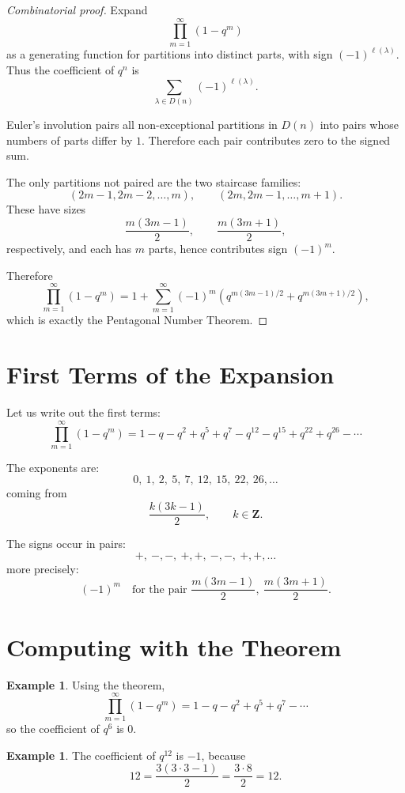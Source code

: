 \documentclass[11pt]{article}
\theoremstyle{definition}
\newtheorem{example}[theorem]{Example}
\theoremstyle{remark}
\newcommand{\ZZ}{\mathbf{Z}}
\begin{document}
	\begin{proof}[Combinatorial proof]
		Expand
		\[
		\prod_{m=1}^{\infty}(1-q^m)
		\]
		as a generating function for partitions into distinct parts, with sign \((-1)^{\ell(\lambda)}\). Thus the coefficient of \(q^n\) is
		\[
		\sum_{\lambda\in D(n)}(-1)^{\ell(\lambda)}.
		\]
		
		Euler's involution pairs all non-exceptional partitions in \(D(n)\) into pairs whose numbers of parts differ by \(1\). Therefore each pair contributes zero to the signed sum.
		
		The only partitions not paired are the two staircase families:
		\[
		(2m-1,2m-2,\dots,m),
		\qquad
		(2m,2m-1,\dots,m+1).
		\]
		These have sizes
		\[
		\frac{m(3m-1)}{2},
		\qquad
		\frac{m(3m+1)}{2},
		\]
		respectively, and each has \(m\) parts, hence contributes sign \((-1)^m\).
		
		Therefore
		\[
		\prod_{m=1}^{\infty}(1-q^m)
		=
		1+\sum_{m=1}^{\infty}(-1)^m
		\left(q^{m(3m-1)/2}+q^{m(3m+1)/2}\right),
		\]
		which is exactly the Pentagonal Number Theorem.
	\end{proof}
	
	\section{First Terms of the Expansion}
	
	Let us write out the first terms:
	\[
	\prod_{m=1}^{\infty}(1-q^m)
	=
	1-q-q^2+q^5+q^7-q^{12}-q^{15}+q^{22}+q^{26}-\cdots
	\]
	
	The exponents are:
	\[
	0,\ 1,\ 2,\ 5,\ 7,\ 12,\ 15,\ 22,\ 26,\dots
	\]
	coming from
	\[
	\frac{k(3k-1)}{2},
	\qquad k\in \ZZ.
	\]
	
	The signs occur in pairs:
	\[
	+,\ -,-,\ +,+,\ -,-,\ +,+,\dots
	\]
	more precisely:
	\[
	(-1)^m \quad \text{for the pair } \frac{m(3m-1)}{2},\ \frac{m(3m+1)}{2}.
	\]
	
	\section{Computing with the Theorem}
	
	\begin{example}
		Using the theorem,
		\[
		\prod_{m=1}^{\infty}(1-q^m)
		=
		1-q-q^2+q^5+q^7-\cdots
		\]
		so the coefficient of \(q^6\) is \(0\).
	\end{example}
	
	\begin{example}
		The coefficient of \(q^{12}\) is \(-1\), because
		\[
		12=\frac{3(3\cdot 3-1)}{2}=\frac{3\cdot 8}{2}=12.
		\]
	\end{example}
	
\end{document}
